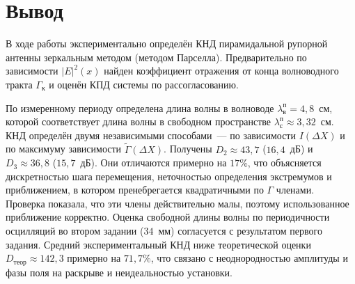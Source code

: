 \section{Вывод}

В ходе работы экспериментально определён КНД пирамидальной рупорной антенны зеркальным методом (методом Парселла). Предварительно по зависимости $|E|^2(x)$ найден коэффициент отражения от конца волноводного тракта $\Gamma_{\text{к}}$ и оценён КПД системы по рассогласованию.

По измеренному периоду определена длина волны в волноводе ${\lambda^{\text{п}}_{\text{в}}} = 4{,}8$~см, которой соответствует длина волны в свободном пространстве ${\lambda^{\text{п}}_{\text{с}}} \approx 3{,}32$~см. КНД определён двумя независимыми способами~--- по зависимости $I(\Delta X)$ и по максимуму зависимости $\widetilde{\Gamma}(\Delta X)$. Получены $D_2 \approx 43{,}7$ ($16{,}4$~дБ) и $D_3 \approx 36{,}8$ ($15{,}7$~дБ). Они отличаются примерно на $17\%$, что объясняется дискретностью шага перемещения, неточностью определения экстремумов и приближением, в котором пренебрегается квадратичными по $\Gamma$ членами. Проверка показала, что эти члены действительно малы, поэтому использованное приближение корректно. Оценка свободной длины волны по периодичности осцилляций во втором задании ($34$~мм) согласуется с результатом первого задания. Средний экспериментальный КНД ниже теоретической оценки $D_{\text{теор}} \approx 142{,}3$ примерно на $71{,}7\%$, что связано с неоднородностью амплитуды и фазы поля на раскрыве и неидеальностью установки.
